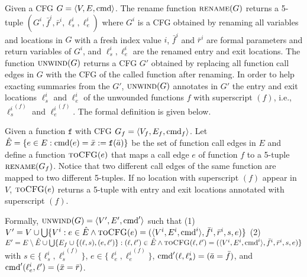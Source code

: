 Given a CFG $G=\langle
V, E,\textmd{cmd} \rangle$. The rename function $\textsc{rename}(G)$ returns a 5-tuple $(G^i, \bar{f}^i, \bar{r}^i,\ell_s^i,\ell_e^i)$ where $G^i$ is a CFG obtained by renaming all variables and locations in $G$ with a fresh index value $i$, $\bar{f}^i$ and $\bar{r}^i$ are formal parameters and return variables of $G^i$, and $\ell_s^i,\ell_e^i$ are the renamed entry and exit locations. The function $\textsc{unwind}(G)$ returns a CFG $G'$ obtained by replacing all function call edges in $G$ with the CFG of the called function after renaming. In order to help exacting summaries from the $G'$, $\textsc{unwind}(G)$ annotates in $G'$ the entry and exit locations ${\ell_s^i}$ and ${\ell_e^i}$ of the unwounded functions $f$ with superscript $(f)$, i.e., ${\ell_s^i}^{(f)}$ and ${\ell_e^i}^{(f)}$. The formal definition is given below.

Given a function $\mathtt{f}$ with CFG $G_f=\langle
V_f, E_f,\textmd{cmd}_f \rangle$.
Let $\hat{E} =\{e\in E: \textmd{cmd} (e)= \bar{x}:=\mathtt{f}(\bar{a})\}$ be the set of function call edges in $E$ and define a function $\textsc{toCFG}(e)$ that maps a call edge $e$ of function $f$ to a 5-tuple $\textsc{rename}(G_f)$. Notice that two different call edges of the same function are mapped to two different 5-tuples. If no location with superscript $(f)$ appear in $V$, $\textsc{toCFG}(e)$ returns a 5-tuple with entry and exit locations annotated with superscript $(f)$.

Formally, $\textsc{unwind}(G) = \langle V', E',\textmd{cmd}' \rangle$ such that (1) $V' = V\cup \bigcup\{V^i: e\in \hat{E} \wedge \textsc{toCFG}(e)= (\langle V^i, E^i,\textmd{cmd}^i \rangle, \bar{f}^i, \bar{r}^i,s,e) \}$ (2) $E'= E \setminus \hat{E} \cup \bigcup\{E_f\cup\{(\ell, s),(e, \ell')\}: (\ell, \ell')\in \hat{E} \wedge \textsc{toCFG}(\ell, \ell')= (\langle V^i, E^i,\textmd{cmd}^i \rangle, \bar{f}^i, \bar{r}^i,s,e) \}$ with $s\in \{\ell_s^i,{\ell_s^i}^{(f)}\}$, $e\in \{\ell_e^i,{\ell_e^i}^{(f)}\}$, $\textmd{cmd}' (\ell, {\ell_s^i}) = (\bar{a}=\bar{f})$, and $\textmd{cmd}' ({\ell_e^i}, \ell') = (\bar{x}=\bar{r})$.





